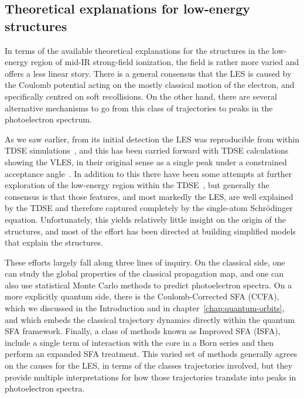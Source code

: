 \subsection{Theoretical explanations for low-energy structures}
\label{sec:LES-theory}
In terms of the available theoretical explanations for the structures in the low-energy region of mid-{IR} strong-field ionization, the field is rather more varied and offers a less linear story. There is a general consensus that the LES is caused by the Coulomb potential acting on the mostly classical motion of the electron, and specifically centred on soft recollisions. On the other hand, there are several alternative mechanisms to go from this class of trajectories to peaks in the photoelectron spectrum.



As we saw earlier, from its initial detection the LES was reproducible from within TDSE simulations~\cite{blaga_original_LES,catoire_angular-distributions_2009}, and this has been carried forward with TDSE calculations showing the VLES, in their original sense as a single peak under a constrained acceptance angle~\cite{VLES_characterization}. In addition to this there have been some attempts at further exploration of the low-energy region within the TDSE~\cite{telnov_TDSE_with_and_without_Coulomb, lemell_classicalquantum_2013}, but generally the consensus is that those features, and most markedly the LES, are well explained by the TDSE and therefore captured completely by the single-atom Schrödinger equation. Unfortunately, this yields relatively little insight on the origin of the structures, and most of the effort has been directed at building simplified models that explain the structures.



These efforts largely fall along three lines of inquiry. On the classical side, one can study the global properties of the classical propagation map, and one can also use statistical Monte Carlo methods to predict photoelectron spectra. On a more explicitly quantum side, there is the Coulomb-Corrected SFA (CCFA), which we discussed in the Introduction and in chapter~\ref{chap:quantum-orbits}, and which embeds the classical trajectory dynamics directly within the quantum SFA framework. Finally, a class of methods known as Improved SFA (ISFA), include a single term of interaction with the core in a Born series and then perform an expanded SFA treatment. This varied set of methods generally agrees on the causes for the LES, in terms of the classes trajectories involved, but they provide multiple interpretations for how those trajectories translate into peaks in photoelectron spectra.	


